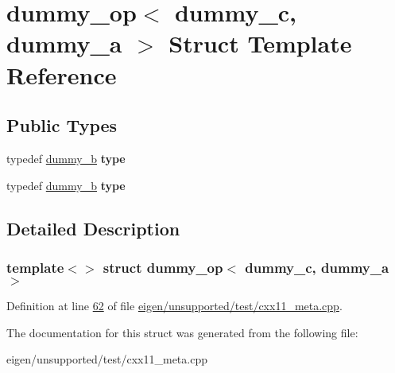 \hypertarget{structdummy__op_3_01dummy__c_00_01dummy__a_01_4}{}\section{dummy\+\_\+op$<$ dummy\+\_\+c, dummy\+\_\+a $>$ Struct Template Reference}
\label{structdummy__op_3_01dummy__c_00_01dummy__a_01_4}
\subsection*{Public Types}
\begin{DoxyCompactItemize}
\item 
\mbox{\label{structdummy__op_3_01dummy__c_00_01dummy__a_01_4_adcc2945ef0d667463b2c9f36c259fd19}} 
typedef \hyperlink{structdummy__b}{dummy\+\_\+b} {\bfseries type}
\item 
\mbox{\label{structdummy__op_3_01dummy__c_00_01dummy__a_01_4_adcc2945ef0d667463b2c9f36c259fd19}} 
typedef \hyperlink{structdummy__b}{dummy\+\_\+b} {\bfseries type}
\end{DoxyCompactItemize}


\subsection{Detailed Description}
\subsubsection*{template$<$$>$\newline
struct dummy\+\_\+op$<$ dummy\+\_\+c, dummy\+\_\+a $>$}



Definition at line \hyperlink{eigen_2unsupported_2test_2cxx11__meta_8cpp_source_l00062}{62} of file \hyperlink{eigen_2unsupported_2test_2cxx11__meta_8cpp_source}{eigen/unsupported/test/cxx11\+\_\+meta.\+cpp}.



The documentation for this struct was generated from the following file\+:\begin{DoxyCompactItemize}
\item 
eigen/unsupported/test/cxx11\+\_\+meta.\+cpp\end{DoxyCompactItemize}
